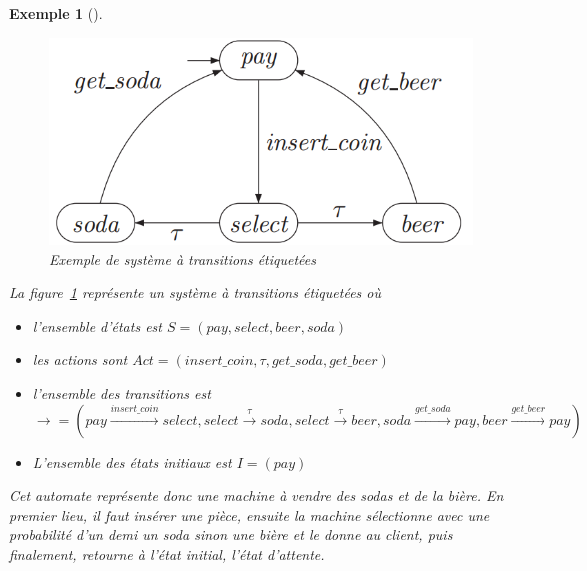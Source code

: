 \documentclass[12pt,a4paper,oneside]{book}
\theoremstyle{break}
\newtheorem{exem}{Exemple}[chapter]
\theoremstyle{breakplain}
\begin{document}
\begin{exem}[\cite{baier2008principles}]
$\quad$
\begin{figure}[h]
\begin{center}
\includegraphics[scale=0.5]{images/exemplts.png}
\caption{Exemple de système à transitions étiquetées \cite{baier2008principles}}
\label{exemplts}
\end{center}
\end{figure}

La figure~\ref{exemplts} représente un système à transitions étiquetées où
\begin{itemize}
\item l'ensemble d'états est $S = (pay, select, beer, soda)$
\item les actions sont $Act = (insert\_coin, \tau, get\_soda, get\_beer)$
\item l'ensemble des transitions est $\rightarrow = (pay\xrightarrow{insert\_coin}{}select, select\xrightarrow{\tau}{}soda, select\xrightarrow{\tau}{}beer, soda\xrightarrow{get\_soda}{}pay, beer\xrightarrow{get\_beer}{}pay)$
\item L'ensemble des états initiaux est $I = (pay)$
\end{itemize}
Cet automate représente donc une machine à vendre des sodas et de la bière. En premier lieu, il faut insérer une pièce, ensuite la machine sélectionne avec une probabilité d’un demi un soda sinon une bière et le donne au client, puis finalement, retourne à l'état initial, l'état d'attente.


\end{exem}
\end{document}
